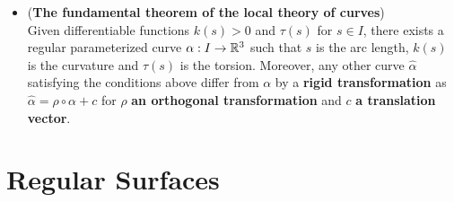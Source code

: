 \documentclass[11pt]{article}
\begin{document}
\begin{itemize}
\item 
\begin{theorem}\label{th: curv_tri} 
(\textbf{The fundamental theorem of the local theory of curves})  \citep{do1976differential}\\
Given differentiable functions $k(s)>0$ and $\tau(s)$ for $s\in I$, there exists a regular parameterized curve $\alpha: I\rightarrow {\mathbb R}^{3}$ such that $s$ is the arc length, $k(s)$ is the curvature and $\tau(s)$ is the torsion. Moreover, any other curve $\hat{\alpha}$ satisfying the conditions above differ from $\alpha$ by a \textbf{rigid transformation} as $\hat{\alpha} = \rho\circ \alpha + c$ for $\rho$ \textbf{an orthogonal transformation} and $c$ \textbf{a translation vector}. 
\end{theorem}\vspace{5pt}
\end{itemize}

\section{Regular Surfaces}
\end{document}
